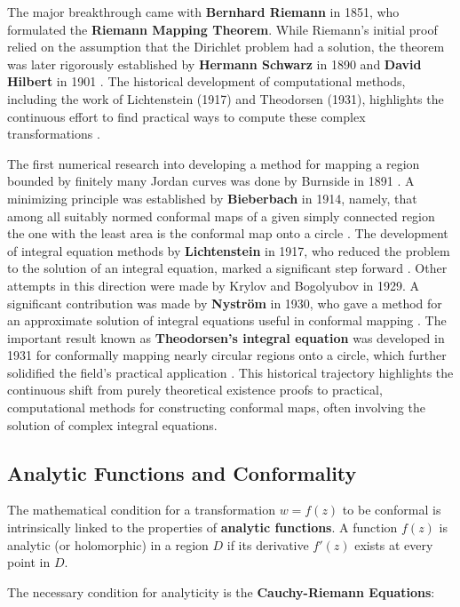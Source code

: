 \documentclass[12pt,a4paper]{article}
\begin{document}
The major breakthrough came with \textbf{Bernhard Riemann} in 1851, who
formulated the \textbf{Riemann Mapping Theorem}. While Riemann's initial
proof relied on the assumption that the Dirichlet problem had a
solution, the theorem was later rigorously established by
\textbf{Hermann Schwarz} in 1890 and \textbf{David Hilbert} in 1901
. The historical development of computational methods, including
the work of Lichtenstein (1917) and Theodorsen (1931), highlights the
continuous effort to find practical ways to compute these complex
transformations .

The first numerical research into developing a method for
mapping a region bounded by finitely many Jordan curves was done by
Burnside in 1891 . A minimizing principle was established by
\textbf{Bieberbach} in 1914, namely, that among all suitably normed
conformal maps of a given simply connected region the one with the least
area is the conformal map onto a circle . The development of
integral equation methods by \textbf{Lichtenstein} in 1917, who reduced
the problem to the solution of an integral equation, marked a
significant step forward . Other attempts in this direction were
made by Krylov and Bogolyubov in 1929. A significant contribution was
made by \textbf{Nyström} in 1930, who gave a method for an approximate
solution of integral equations useful in conformal mapping . The
important result known as \textbf{Theodorsen's integral equation} was
developed in 1931 for conformally mapping nearly circular regions onto a
circle, which further solidified the field's practical application
. This historical trajectory highlights the continuous shift from
purely theoretical existence proofs to practical, computational methods
for constructing conformal maps, often involving the solution of complex
integral equations.

\subsection{Analytic Functions and
Conformality}\label{analytic-functions-and-conformality}

The mathematical condition for a transformation \(w = f(z)\) to be
conformal is intrinsically linked to the properties of \textbf{analytic
functions}. A function \(f(z)\) is analytic (or holomorphic) in a region
\(D\) if its derivative \(f'(z)\) exists at every point in \(D\).

The necessary condition for analyticity is the
\textbf{Cauchy-Riemann Equations}:
\end{document}
